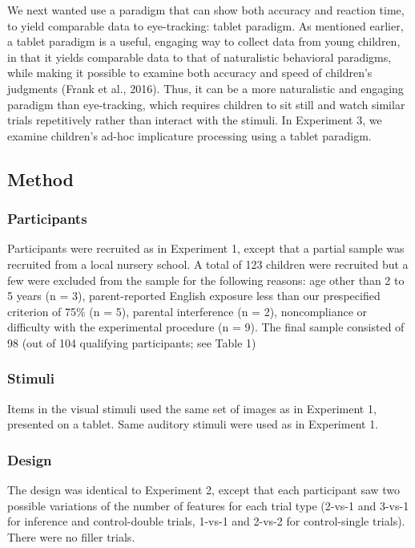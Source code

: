 \documentclass[a4paper,man,apacite,floatsintext]{apa6}
\begin{document}
We next wanted use a paradigm that can show both accuracy and reaction
time, to yield comparable data to eye-tracking: tablet paradigm. As
mentioned earlier, a tablet paradigm is a useful, engaging way to
collect data from young children, in that it yields comparable data to
that of naturalistic behavioral paradigms, while making it possible to
examine both accuracy and speed of children's judgments (Frank et al.,
2016). Thus, it can be a more naturalistic and engaging paradigm than
eye-tracking, which requires children to sit still and watch similar
trials repetitively rather than interact with the stimuli. In Experiment
3, we examine children's ad-hoc implicature processing using a tablet
paradigm.

\subsection{Method}\label{method-2}

\subsubsection{Participants}\label{participants-2}

Participants were recruited as in Experiment 1, except that a partial
sample was recruited from a local nursery school. A total of 123
children were recruited but a few were excluded from the sample for the
following reasons: age other than 2 to 5 years (n = 3), parent-reported
English exposure less than our prespecified criterion of 75\% (n = 5),
parental interference (n = 2), noncompliance or difficulty with the
experimental procedure (n = 9). The final sample consisted of 98 (out of
104 qualifying participants; see Table 1)

\subsubsection{Stimuli}\label{stimuli-1}

Items in the visual stimuli used the same set of images as in Experiment
1, presented on a tablet. Same auditory stimuli were used as in
Experiment 1.

\subsubsection{Design}\label{design}

The design was identical to Experiment 2, except that each participant
saw two possible variations of the number of features for each trial
type (2-vs-1 and 3-vs-1 for inference and control-double trials, 1-vs-1
and 2-vs-2 for control-single trials). There were no filler trials.
\end{document}
